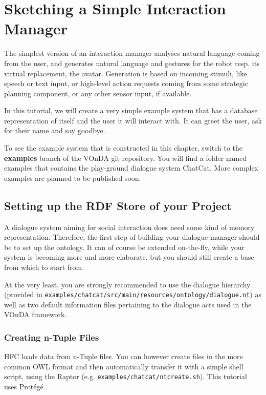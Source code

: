 \documentclass[a4paper]{report}
\newcommand{\vonda}{VOnDA\xspace}
\begin{document}
\chapter{Sketching a Simple Interaction Manager}

The simplest version of an interaction manager analyses natural language
coming from the user, and generates natural language and gestures for the robot
resp. its virtual replacement, the avatar. Generation is based on incoming
stimuli, like speech or text input, or high-level action requests coming from
some strategic planning component, or any other sensor input, if available.

In this tutorial, we will create a very simple example system that has a database representation of itself and the user it will interact with. It can greet the user, ask for their name and say goodbye.

To see the example system that is constructed in this chapter, switch to the \textbf{examples} branch of the \vonda git repository. You will find a folder named examples that contains the play-ground dialogue system ChatCat. More complex examples are planned to be published soon.

\section{Setting up the RDF Store of your Project} \label{sec:example-hfc}

A dialogue system aiming for social interaction does need some kind of memory representation. Therefore, the first step of building your dialogue manager should be to set up the ontology. It can of course be extended on-the-fly, while your system is becoming more and more elaborate, but you should still create a base from which to start from.

At the very least, you are strongly recommended to use the dialogue hierarchy (provided in \texttt{examples/chatcat/src/main/resources/ontology/dialogue.nt}) as well as two default information files pertaining to the dialogue acts used in the \vonda framework.

\subsection{Creating n-Tuple Files}

HFC loads data from n-Tuple files. You can however create files in the more common OWL format and then automatically transfer it with a simple shell script, using the Raptor \citep{raptor} (e.g. \texttt{examples/chatcat/ntcreate.sh}). This tutorial uses Protégé \citep{Protege}.
\end{document}
